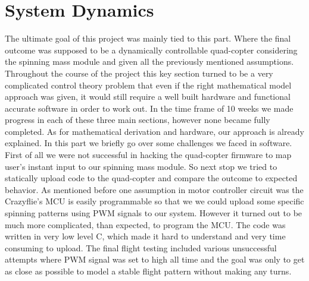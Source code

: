 \section{System Dynamics}
The ultimate goal of this project was mainly tied to  this part. Where the final outcome was supposed to be a dynamically controllable quad-copter considering the spinning mass module and given all the previously mentioned assumptions. 
\newline Throughout the course of the project this key section turned to be a very complicated control theory problem that even if the right mathematical model approach was given, it would still require a well built hardware and functional accurate software in order to work out. 
In the time frame of 10 weeks we made progress in each of these three main sections, however none became fully completed. As for mathematical derivation and hardware, our approach is already explained. In this part we briefly go over some challenges we faced in software. 
\newline First of all we were not successful in hacking the quad-copter firmware to map user's instant input to our spinning mass module. So next stop we tried to statically upload code to the quad-copter and compare the outcome to expected behavior. As mentioned before one assumption in motor controller circuit was the Crazyflie's MCU is easily programmable so that we we could upload some specific spinning patterns using PWM signals to our system. However it turned out to be much more complicated, than expected, to program the MCU. The code was written in very low level C, which made it hard to understand and very time consuming to upload.
\newline The final flight testing included various unsuccessful attempts where PWM signal was set to high all time and the goal was only to get as close as possible to model a stable flight pattern without making any turns.    
 


